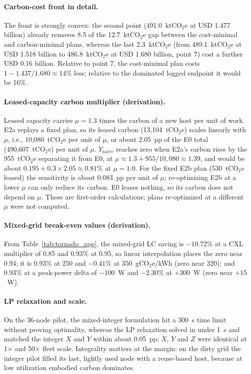 \documentclass{article} %
\begin{document}
\paragraph{Carbon-cost front in detail.} The front is strongly convex: the second point (491.0~ktCO$_2$e at USD 1.477 billion) already removes 8.5 of the 12.7~ktCO$_2$e gap between the cost-minimal and carbon-minimal plans, whereas the last 2.3~ktCO$_2$e (from 489.1~ktCO$_2$e at USD 1.518 billion to 486.8~ktCO$_2$e at USD 1.680 billion, point 7) cost a further USD 0.16 billion. Relative to point 7, the cost-minimal plan costs $1-1.437/1.680\approx 14\%$ less; relative to the dominated logged endpoint it would be 16\%.

\paragraph{Leased-capacity carbon multiplier (derivation).} Leased capacity carries $\mu = 1.3$ times the carbon of a new host per unit of work. E2a replays a fixed plan, so its leased carbon (13,104~tCO$_2$e) scales linearly with $\mu$, i.e., 10,080~tCO$_2$e per unit of $\mu$, or about 2.05~pp of the E0 total (490,607~tCO$_2$e) per unit of $\mu$. $Y_{\text{naive}}$ reaches zero when E2a's carbon rises by the 955~tCO$_2$e separating it from E0, at $\mu \approx 1.3 + 955/10{,}080 \approx 1.39$, and would be about $0.195 + 0.3 \times 2.05 \approx 0.81\%$ at $\mu = 1.0$. For the fixed E2b plan (530~tCO$_2$e leased) the sensitivity is about 0.083~pp per unit of $\mu$; re-optimizing E2b at a lower $\mu$ can only reduce its carbon. E0 leases nothing, so its carbon does not depend on $\mu$. These are first-order calculations; plans re-optimized at a different $\mu$ were not computed.

\paragraph{Mixed-grid break-even values (derivation).} From Table~\ref{tab:tornado_app}, the mixed-grid LC saving is $-10.72\%$ at a CXL multiplier of 0.85 and 0.93\% at 0.95, so linear interpolation places the zero near 0.94; it is 0.93\% at 250 and $-0.41\%$ at 350~gCO$_2$e/kWh (zero near 320); and 0.93\% at a peak-power delta of $-100$~W and $-2.30\%$ at $+300$~W (zero near $+15$~W).

\paragraph{LP relaxation and scale.} On the 36-node pilot, the mixed-integer formulation hit a 300~s time limit without proving optimality, whereas the LP relaxation solved in under 1~s and matched the integer $X$ and $Y$ within about 0.05~pp; $X$, $Y$ and $Z$ were identical at 1$\times$ and 50$\times$ fleet scale. Integrality matters at the margin: on the dirty grid the integer pilot filled its last, lightly used node with a reuse-based host, because at low utilization embodied carbon dominates.
\end{document}
